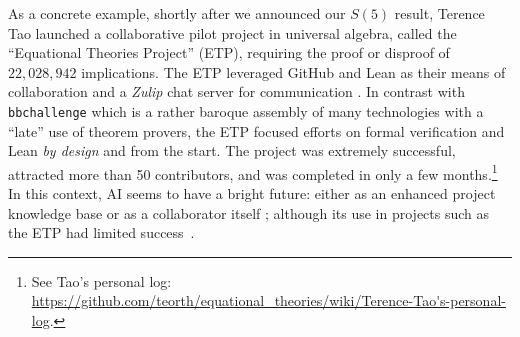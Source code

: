 \documentclass[sigconf,screen]{acmart}
\theoremstyle{definition} %
\numberwithin{equation}{section}
\theoremstyle{definition} %
\newcommand{\CoqBB}{Coq-BB5\xspace}
\begin{document}
As a concrete example, shortly after we announced our $S(5)$ result, Terence Tao launched a collaborative pilot project in universal algebra, called the ``Equational Theories Project'' (ETP), requiring the proof or disproof of $22{,}028{,}942$ implications. The ETP leveraged GitHub and Lean as their means of collaboration and a \textit{Zulip} chat server for communication \cite{TaoBlog, swh-dir-426b52b, ETPpaper}. In contrast with \texttt{bbchallenge} which is a rather baroque assembly of many technologies with a ``late'' use of theorem provers, the ETP focused efforts on formal verification and Lean \textit{by design} and from the start. The project was extremely successful, attracted more than 50 contributors, and was completed in only a few months.\footnote{See Tao's personal log: \url{https://github.com/teorth/equational_theories/wiki/Terence-Tao's-personal-log}.} In this context, AI seems to have a bright future: either as an enhanced project knowledge base or as a collaborator itself \cite{Trinh2024, wu2024internlm25stepproveradvancingautomatedtheorem}; although its use in projects such as the ETP had limited success~\cite{ETPpaper}.





\end{document}
